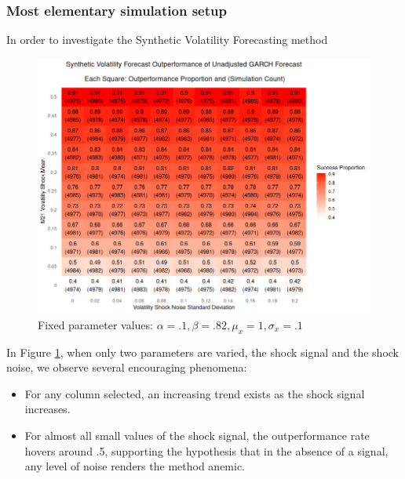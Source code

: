 \documentclass[11pt]{article}
\theoremstyle{definition}
\begin{document}
\subsubsection{Most elementary simulation setup}

In order to investigate the Synthetic Volatility Forecasting method

\begin{figure}[h!]
\begin{center}
  \includegraphics[scale=.45]{simulation_plots/standard_simulation_alpha_.1_beta_.82.png}
  \caption{Fixed parameter values: $\alpha = .1, \beta = .82, \mu_{x} = 1, \sigma_{x} = .1$}
  \label{fig:heavy_beta}
\end{center}
\end{figure}

In Figure \ref{fig:heavy_beta}, when only two parameters are varied, the shock signal and the shock noise, we observe several encouraging phenomena:
\begin{itemize}
\item For any column selected, an increasing trend exists as the shock signal increases.
\item For almost all small values of the shock signal, the outperformance rate hovers around .5, supporting the hypothesis that in the absence of a signal, any level of noise renders the method anemic.
\end{itemize}
\end{document}
